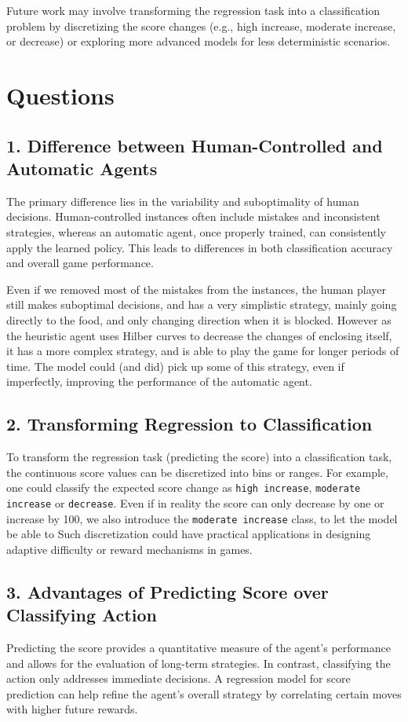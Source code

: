 \documentclass[12pt,a4paper]{article}
\begin{document}
Future work may involve transforming the regression task into a classification problem by discretizing the score changes (e.g., high increase, moderate increase, or decrease) or exploring more advanced models for less deterministic scenarios.




\section{Questions}
\subsection*{1. Difference between Human-Controlled and Automatic Agents}
The primary difference lies in the variability and suboptimality of human decisions. 
Human-controlled instances often include mistakes and inconsistent strategies, whereas an automatic agent, once properly trained, can consistently apply the learned policy. 
This leads to differences in both classification accuracy and overall game performance.

Even if we removed most of the mistakes from the instances, the human player still makes suboptimal decisions,
and has a very simplistic strategy, mainly going directly to the food, and only changing direction when it is blocked.
However as the heuristic agent uses Hilber curves to decrease the changes of enclosing itself, it has a more complex strategy, and is able to play the game for longer periods of time.
The model could (and did) pick up some of this strategy, even if imperfectly, improving the performance of the automatic agent.



\subsection*{2. Transforming Regression to Classification}
To transform the regression task (predicting the score) into a classification task, the continuous score values can be discretized into bins or ranges. 
For example, one could classify the expected score change as \texttt{high increase}, \texttt{moderate increase} or \texttt{decrease}. 
Even if in reality the score can only decrease by one or increase by 100, 
we also introduce the \texttt{moderate increase} class, to let the model be able to 
Such discretization could have practical applications in designing adaptive difficulty or reward mechanisms in games.

\subsection*{3. Advantages of Predicting Score over Classifying Action}
Predicting the score provides a quantitative measure of the agent’s performance and allows for the evaluation of long-term strategies. In contrast, classifying the action only addresses immediate decisions. A regression model for score prediction can help refine the agent’s overall strategy by correlating certain moves with higher future rewards.
\end{document}
